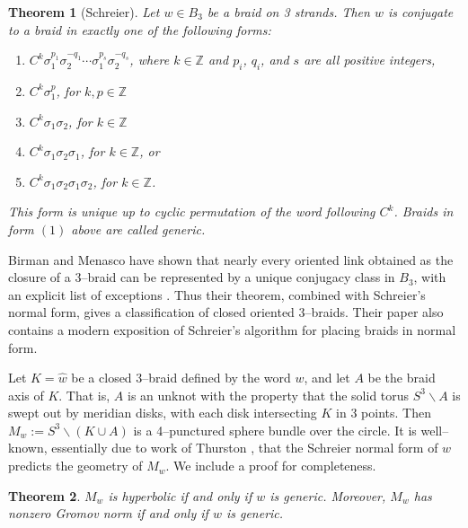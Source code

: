 \documentclass[11pt]{amsart}
\renewcommand{\setminus}{{\smallsetminus}}
\newcommand{\ZZ}{{\mathbb{Z}}}
\theoremstyle{plain}
\newtheorem{theorem}{Theorem}[section]
\theoremstyle{definition}
\begin{document}
\begin{theorem}[Schreier]\label{thm:schreier-normal}
Let $w \in B_3$ be a braid on 3 strands.  Then $w$ is conjugate to a
braid in exactly one of the following forms:
\begin{enumerate}
\item $C^k \sigma_1^{p_1} \sigma_2^{-q_1} \cdots \sigma_1^{p_s}
\sigma_2^{-q_s}$, where $k \in \ZZ$ and $p_i$, $q_i$, and $s$ are all
positive integers,
\item $C^k \sigma_1^p$, \quad for $k, p \in \ZZ$
\item $C^k \sigma_1 \sigma_2$, \quad for $k \in \ZZ$
\item $C^k \sigma_1 \sigma_2 \sigma_1$, \quad for $k \in \ZZ$, or
\item $C^k \sigma_1 \sigma_2 \sigma_1 \sigma_2$, \quad for $k \in \ZZ$.
\end{enumerate}
This form is unique up to cyclic permutation of the word following
$C^k$.  Braids in form $(1)$ above are called \emph{generic}.
\end{theorem}

Birman and Menasco have shown that nearly every oriented link obtained
as the closure of a 3--braid can be represented by a unique conjugacy
class in $B_3$, with an explicit list of exceptions
\cite{birman-menasco:3braids}.  Thus their theorem, combined with
Schreier's normal form, gives a classification of closed oriented
$3$--braids.  Their paper also contains a modern exposition of
Schreier's algorithm for placing braids in normal form.

Let $K = \hat{w}$ be a closed 3--braid defined by the word $w$, and
let $A$ be the braid axis of $K$. That is, $A$ is an unknot with the
property that the solid torus $S^3 \setminus A$ is swept out by
meridian disks, with each disk intersecting $K$ in 3 points. Then $M_w
:= S^3 \setminus (K \cup A)$ is a 4--punctured sphere bundle over the
circle.  It is well--known, essentially due to work of Thurston
\cite{thurston:hypII}, that the Schreier normal form of $w$ predicts
the geometry of $M_w$.  We include a proof for completeness.

\begin{theorem}\label{thm:hyperbolic-bundle}
$M_w$ is hyperbolic if and only if $w$ is generic.  Moreover, $M_w$
has nonzero Gromov norm if and only if $w$ is generic.
\end{theorem}
\end{document}
